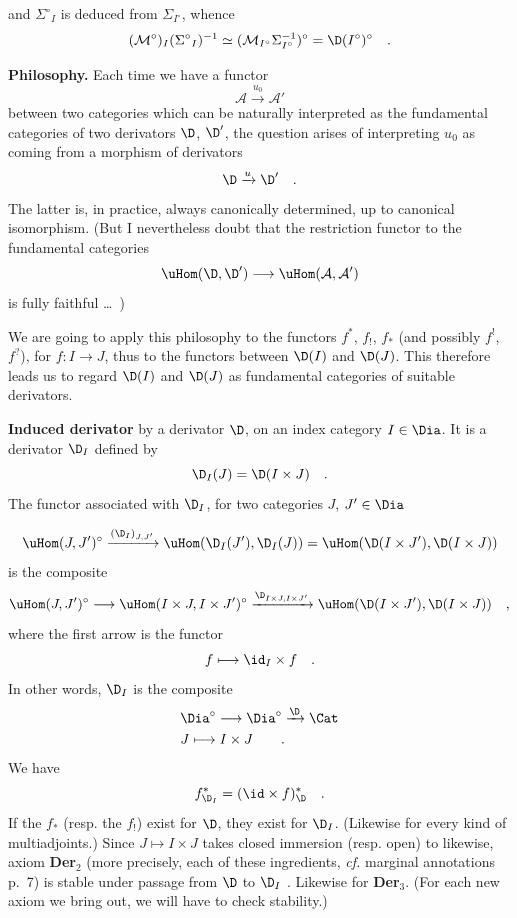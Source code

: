 
and $\Sigma^\circ{}_I$ is deduced from $\Sigma_{I^\circ}$, whence
\[
(\mathcal{M}^\circ)_I(\Sigma^\circ{}_I)^{-1} \simeq (\mathcal{M}_{I^\circ}\Sigma_{I^\circ}^{-1})^\circ = \D(I^\circ)^\circ \quad .
\]


\textbf{Philosophy.} Each time we have a functor
\[
\mathcal{A} \xrightarrow{u_0} \mathcal{A}'
\]
between two categories which can be naturally interpreted as the fundamental categories of two derivators $\D$, $\D'$, the question arises of interpreting $u_0$ as coming from a morphism of derivators
\[
\D \xrightarrow{u} \D' \quad .
\]
The latter is, in practice, always canonically determined, up to canonical isomorphism. (But I nevertheless doubt that the restriction functor to the fundamental categories
\[
\uHom(\D,\D') \longrightarrow \uHom(\mathcal{A},\mathcal{A}')
\]
is fully faithful \dots\ )

We are going to apply this philosophy to the functors $f^*$, $f_!$, $f_*$ (and possibly $f^!$, $f^?$), for $f : I \to J$, thus to the functors between $\D(I)$ and $\D(J)$. This therefore leads us to regard $\D(I)$ and $\D(J)$ as fundamental categories of suitable derivators.

\textbf{Induced derivator} by a derivator $\D$, on an index category $I \in \Dia$. It is a derivator $\D_I$ defined by
\[
\D_I(J) = \D(I \times J) \quad .
\]
The functor associated with $\D_I$, for two categories $J$, $J' \in \Dia$

\[
\uHom(J,J')^\circ \xrightarrow{(\D_I)_{J,J'}} \uHom(\D_I(J'),\D_I(J)) = \uHom(\D(I\times J'),\D(I\times J))
\]
is the composite
\[
\uHom(J,J')^\circ \longrightarrow \uHom(I\times J, I\times J')^\circ \xrightarrow{\D_{I\times J,I\times J'}} \uHom(\D(I\times J'),\D(I\times J)) \quad ,
\]
where the first arrow is the functor
\[
f \longmapsto \id_I \times f \quad .
\]
In other words, $\D_I$ is the composite
\[
\begin{aligned}
&\Dia^\circ \longrightarrow \Dia^\circ \xrightarrow{\D} \Cat \\
&J \longmapsto I \times J \qquad .
\end{aligned}
\]
We have
\[
f^*_{\D_I} = (\id \times f)^*_{\D} \quad .
\]
If the $f_*$ (resp. the $f_!$) exist for $\D$, they exist for $\D_I$. (Likewise for every kind of multiadjoints.) Since $J \mapsto I \times J$ takes closed immersion (resp. open) to likewise, axiom \textbf{Der}$_2$ (more precisely, each of these ingredients, \textit{cf.} marginal annotations p.~7) is stable under passage from $\D$ to $\D_I$ . Likewise for \textbf{Der}$_3$. (For each new axiom we bring out, we will have to check stability.)

